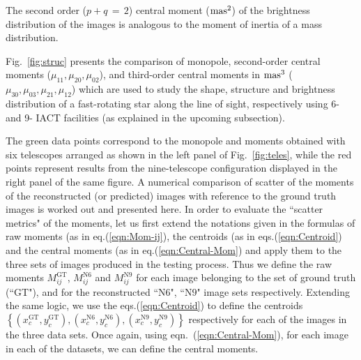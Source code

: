 The second order ($p+q\,=\,2$) central moment ($\rm mas^{2}$) of the brightness distribution of the images is analogous to the moment of inertia of a mass distribution. 

Fig.~\ref{fig:struc} presents the comparison of monopole, second-order central moments (\(\mu_{11}, \mu_{20}, \mu_{02}\)), and third-order central moments in $\rm mas^{3}$ (\(\mu_{30}, \mu_{03}, \mu_{21}, \mu_{12}\)) which are used to study the shape, structure and brightness distribution of a fast-rotating star along the line of sight, respectively using 6- and 9- IACT facilities (as explained in the upcoming subsection).

The green data points correspond to the monopole and moments obtained with six telescopes arranged as shown in the left panel of Fig.~\ref{fig:teles}, while the red points represent results from the nine-telescope configuration displayed in the right panel of the same figure. A numerical comparison of scatter of the moments of the reconstructed (or predicted) images with reference to the ground truth images is worked out and presented here. In order to evaluate the ``scatter metrics" of the moments, let us first extend the notations given in the formulas of raw moments (as in eq.(\ref{eqn:Mom-ij}), the centroids (as in eqs.(\ref{eqn:Centroid}) and the central moments (as in eq.(\ref{eqn:Central-Mom}) and apply them to the three sets of images produced in the testing process. Thus we define the raw moments $M_{ij}^{\mathrm{GT}}$, $M_{ij}^{\mathrm{N6}}$ and $M_{ij}^{\mathrm{N9}}$ for each image belonging to the set of ground truth  (``$\mathrm{GT}$"), and for the reconstructed ``$\mathrm{N6}$", ``$\mathrm{N9}$" image sets respectively. Extending the same logic, we use the eqs.(\ref{eqn:Centroid}) to define the centroids
$\left\{\left(x_c^{\mathrm{GT}}, y_c^{\mathrm{GT}}\right),
\left(x_c^{\mathrm{N6}}, y_c^{\mathrm{N6}}\right),
\left(x_c^{\mathrm{N9}}, y_c^{\mathrm{N9}}\right)\right\}$
respectively for each of the images in the three data sets.
Once again, using eqn.~(\ref{eqn:Central-Mom}), for each image in each of the datasets, we can define the central moments.

